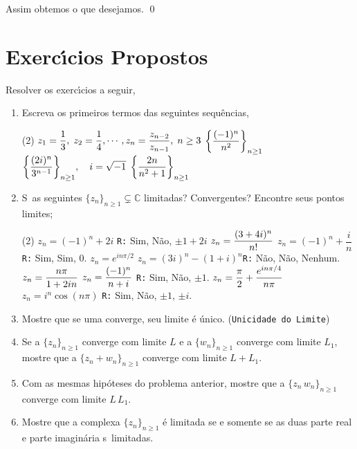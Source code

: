 Assim obtemos o que desejamos. \qed


\section*{Exerc\'{\i}cios Propostos}

Resolver os exerc\'{\i}cios a seguir,
\begin{enumerate}[label=(\arabic*)]
\item Escreva os primeiros termos das seguintes sequ\^{e}ncias,
\begin{tasks}[label=(\alph*),item-indent=3em,label-width=4ex,column-sep=8pt,ref=(\alph*)](2)
\task \(\displaystyle{z_1=\frac{1}{3},\;z_2=\frac{1}{4},\cdots, z_n=\frac{z_{n-2}}{z_{n-1}},\;n \geq 3}\)
\task \(\displaystyle{\left\{\frac{(-1)^n}{n^2}\right\}_{n\geq 1}}\)
\task \(\displaystyle{ \left\{\frac{(2i)^n}{3^{n-1}}\right\}_{n\geq 1}},\quad i=\sqrt{-1}\) 
\task \(\displaystyle{ \left\{\frac{2n}{n^2+1}\right\}_{n\geq 1}}\)
\end{tasks}

\item S\ao\ as seguintes \seqs $\{z_{n}\}_{n\geq 1}\subsetneq \mathbb{C}$ limitadas?
  Convergentes? Encontre seus pontos limites;
\begin{tasks}[label=(\alph*),item-indent=2.5em,label-width=3ex,column-sep=16pt,ref=(\alph*)](2)
  \task $z_n=(-1)^n+2i$ \texttt{R:} Sim, N\~{a}o, $\pm 1+2i$
  \task $z_n=\displaystyle{\frac{(3+4i)^n}{n!}}$
  \task $z_n=(-1)^n+\dfrac{i}{n}$ \texttt{R:} Sim, Sim, $0$.
  \task $z_n=e^{i n\pi/2}$
  \task $z_n=(3i)^n-(1+i)^n$\texttt{R:} N\~{a}o, N\~{a}o, Nenhum.
  \task $z_n=\displaystyle{\frac{n\pi}{1+2in}}$
  \task $z_n=\displaystyle{\frac{(-1)^n}{n+i}}$ \texttt{R:} Sim, N\~{a}o, $\pm 1$.
  \task $z_n=\displaystyle{\frac{\pi}{2}+\frac{e^{i n\pi/4}}{n\pi}}$
  \task $z_n=i^n\cos(n\pi)$ \texttt{R:} Sim, N\~{a}o, $\pm 1$, $\pm i$.
\end{tasks}
  \item  Mostre que se uma \seq converge, seu limite \'{e} \'{u}nico. (\texttt{Unicidade do Limite})
  \item Se a \seq $\{z_n\}_{n\geq 1}$ converge com limite $L$ e a
  \seq $\{w_n\}_{n\geq 1}$ converge com limite $L_1$, mostre que a \seq $\{z_n+w_n\}_{n\geq 1}$ converge com
  limite $L+L_1$.
  \item Com as mesmas hip\'{o}teses do problema anterior, mostre que
  a \seq $\{z_n\,w_n\}_{n\geq 1}$ converge com limite $L\,L_1$.
  \item Mostre que a \seq complexa $\{z_n\}_{n\geq 1}$ \'e
  limitada se e somente se as duas \seqs parte real e parte imagin\'{a}ria s\ao\ limitadas.
\end{enumerate}

